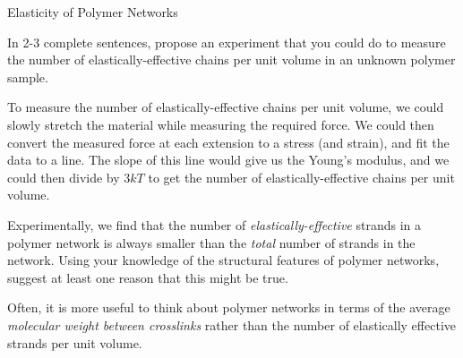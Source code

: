 \begin{activity}{Elasticity of Polymer Networks}
\begin{ctqs}
	\question In 2-3 complete sentences, propose an experiment that you could do to measure the number of elastically-effective chains per unit volume in an unknown polymer sample.
	
		\begin{solution}[1.75in]
		
			To measure the number of elastically-effective chains per unit volume, we could slowly stretch the material while measuring the required force.  We could then convert the measured force at each extension to a stress (and strain), and fit the data to a line.  The slope of this line would give us the Young's modulus, and we could then divide by $3kT$ to get the number of elastically-effective chains per unit volume.
		
		\end{solution}
\end{ctqs}


\begin{exercises}

	\exercise Experimentally, we find that the number of \emph{elastically-effective} strands in a polymer network is always smaller than the \emph{total} number of strands in the network.  Using your knowledge of the structural features of polymer networks, suggest at least one reason that this might be true.
	
		\begin{solution}
		\end{solution}
	
	
	
	
	\exercise Often, it is more useful to think about polymer networks in terms of the average \emph{molecular weight between crosslinks} rather than the number of elastically effective strands per unit volume.
	

\end{exercises}
\end{activity}
